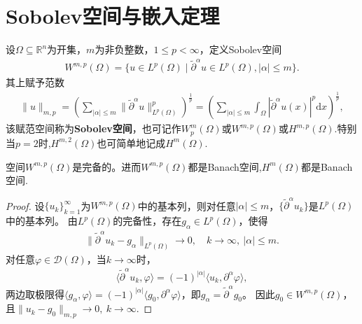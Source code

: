 \documentclass[../../main.tex]{subfiles}%
\begin{document}
\section{Sobolev空间与嵌入定理}

\begin{definition}[Sobolev空间]\label{definition:Sobolev空间}
设$\Omega\subseteq\mathbb{R}^{n}$为开集，$m$为非负整数，$1\leqslant p<\infty$，定义Sobolev空间
\begin{align*}
W^{m,p}(\Omega)=\{u\in L^{p}(\Omega)\mid \widetilde{\partial}^{\alpha}u\in L^{p}(\Omega),|\alpha|\leqslant m\}.
\end{align*}
其上赋予范数
\begin{align*}
\|u\|_{m,p}=\left(\sum\limits_{|\alpha|\leqslant m}\|\widetilde{\partial}^{\alpha}u\|_{L^{p}(\Omega)}^{p}\right)^{\frac{1}{p}}=\left(\sum\limits_{|\alpha|\leqslant m}\int_{\Omega}|\widetilde{\partial}^{\alpha}u(x)|^{p}\mathrm{d}x\right)^{\frac{1}{p}},
\end{align*}
该赋范空间称为\textbf{Sobolev空间}，也可记作$W_{p}^{m}(\Omega)$或$W^{m,p}(\Omega)$或$H^{m,p}(\Omega)$.特别当$p=2$时,$H^{m,2}(\Omega)$也可简单地记成$H^{m}(\Omega)$.
\end{definition}

\begin{theorem}\label{theorem:Sobolev空间的完备性}
空间$W^{m,p}(\Omega)$是完备的。进而$W^{m,p}(\Omega)$都是Banach空间,$H^{m}(\Omega)$都是Banach空间.
\end{theorem}
\begin{proof}
设$\{u_{k}\}_{k=1}^{\infty}$为$W^{m,p}(\Omega)$中的基本列，则对任意$|\alpha|\leqslant m$，$\{\widetilde{\partial}^{\alpha}u_{k}\}$是$L^{p}(\Omega)$中的基本列。
由$L^{p}(\Omega)$的完备性，存在$g_{\alpha}\in L^{p}(\Omega)$，使得
\begin{align*}
\|\widetilde{\partial}^{\alpha}u_{k}-g_{\alpha}\|_{L^{p}(\Omega)}\to 0,\quad k\to\infty,\ |\alpha|\leqslant m.
\end{align*}
对任意$\varphi\in\mathscr{D}(\Omega)$，当$k\to\infty$时，
\begin{align*}
\langle\widetilde{\partial}^{\alpha}u_{k},\varphi\rangle=(-1)^{|\alpha|}\langle u_{k},\partial^{\alpha}\varphi\rangle,
\end{align*}
两边取极限得$\langle g_{\alpha},\varphi\rangle=(-1)^{|\alpha|}\langle g_{0},\partial^{\alpha}\varphi\rangle$，即$g_{\alpha}=\widetilde{\partial}^{\alpha}g_{0}$。
因此$g_{0}\in W^{m,p}(\Omega)$，且$\|u_{k}-g_{0}\|_{m,p}\to 0,\ k\to\infty$.
\end{proof}
\end{document}
